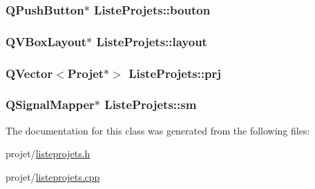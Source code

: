 \subsubsection[{bouton}]{\setlength{\rightskip}{0pt plus 5cm}Q\+Push\+Button$\ast$ Liste\+Projets\+::bouton}\label{class_liste_projets_a0c34df5d18031dd6830eac4e7c3ee9ac}
\hypertarget{class_liste_projets_a5e745a69ba95eeae29269022a08becc4}{}
\subsubsection[{layout}]{\setlength{\rightskip}{0pt plus 5cm}Q\+V\+Box\+Layout$\ast$ Liste\+Projets\+::layout}\label{class_liste_projets_a5e745a69ba95eeae29269022a08becc4}
\hypertarget{class_liste_projets_a675688a1c030d0555daf8d968eaae50c}{}
\subsubsection[{prj}]{\setlength{\rightskip}{0pt plus 5cm}Q\+Vector$<${\bf Projet}$\ast$$>$ Liste\+Projets\+::prj}\label{class_liste_projets_a675688a1c030d0555daf8d968eaae50c}
\hypertarget{class_liste_projets_ab155bcfe455d8951c5ba057e118d10c9}{}
\subsubsection[{sm}]{\setlength{\rightskip}{0pt plus 5cm}Q\+Signal\+Mapper$\ast$ Liste\+Projets\+::sm\hspace{0.3cm}{\ttfamily [private]}}\label{class_liste_projets_ab155bcfe455d8951c5ba057e118d10c9}


The documentation for this class was generated from the following files\+:\begin{DoxyCompactItemize}
\item 
projet/\hyperlink{listeprojets_8h}{listeprojets.\+h}\item 
projet/\hyperlink{listeprojets_8cpp}{listeprojets.\+cpp}\end{DoxyCompactItemize}
